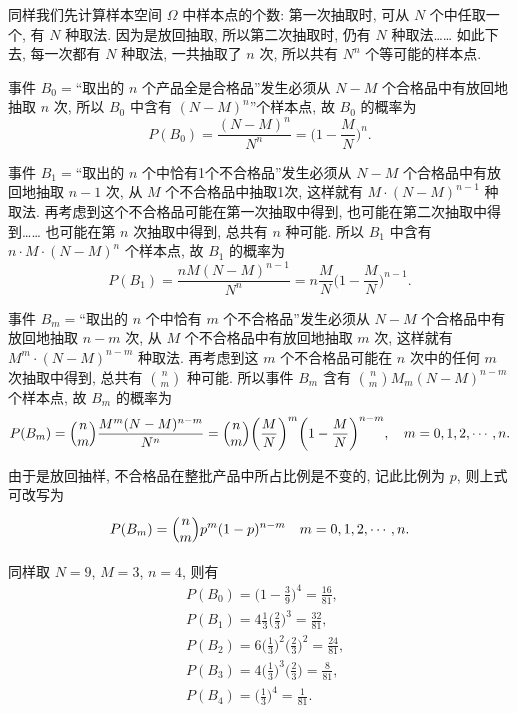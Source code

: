 \begin{solution}
  同样我们先计算样本空间 $\Omega$ 中样本点的个数:
  第一次抽取时,
  可从 $N$ 个中任取一个,
  有 $N$ 种取法.
  因为是放回抽取,
  所以第二次抽取时,
  仍有 $N$ 种取法……
  如此下去,
  每一次都有 $N$ 种取法,
  一共抽取了 $n$ 次,
  所以共有 $N ^n$ 个等可能的样本点.

  事件 $B _0=$“取出的 $n$ 个产品全是合格品”发生必须从 $N - M$ 个合格品中有放回地抽取 $n$ 次,
  所以 $B _0$ 中含有 $(N - M) ^n$”个样本点,
  故 $B _0$ 的概率为
  \[
    P ( B _0 ) = \frac{(N - M)^n}{N ^n} = \biggl( 1 - \frac{M}{N} \biggr) ^n.
  \]

  事件 $B _1=$“取出的 $n$ 个中恰有1个不合格品”发生必须从 $N - M$ 个合格品中有放回地抽取 $n - 1$ 次,
  从 $M$ 个不合格品中抽取1次,
  这样就有 $M \cdot (N - M) ^{n - 1}$ 种取法.
  再考虑到这个不合格品可能在第一次抽取中得到,
  也可能在第二次抽取中得到……
  也可能在第 $n$ 次抽取中得到,
  总共有 $n$ 种可能.
  所以 $B _1$ 中含有 $n \cdot M \cdot (N - M) ^n$ 个样本点,
  故 $B _1$ 的概率为
  \[
    P (B _1) = \frac{nM (N - M) ^{n - 1}}{N ^n} = n \frac{M}{N} \biggl( 1 - \frac{M}{N} \biggr) ^{n - 1}.
  \]

  事件 $B _m =$“取出的 $n$ 个中恰有 $m$ 个不合格品”发生必须从 $N - M$ 个合格品中有放回地抽取 $n - m$ 次,
  从 $M$ 个不合格品中有放回地抽取 $m$ 次,
  这样就有 $M^m \cdot (N - M) ^{n - m}$ 种取法.
  再考虑到这 $m$ 个不合格品可能在 $n$ 次中的任何 $m$ 次抽取中得到,
  总共有 $\binom{n}{m}$ 种可能.
  所以事件 $B _m$ 含有 $\binom{n}{m} M _m (N - M) ^{n - m}$ 个样本点,
  故 $B _m$ 的概率为
  \begin{equation}
    P (B _m) = \Binom{n}{m} \frac{M ^m (N - M)^{n - m}}{N ^n}
    = \Binom{n}{m} \biggl( \frac{M}{N} \biggr) ^m \biggl( 1 - \frac{M}{N} \biggr) ^{n - m},
    \quad m = 0, 1, 2, \dotsc, n.\label{eq1.2.7}
  \end{equation}

  由于是放回抽样,
  不合格品在整批产品中所占比例是不变的,
  记此比例为 $p$,
  则上式可改写为
  \[
    P (B _m) = \Binom{n}{m} p ^m (1 - p) ^{n - m} \quad m = 0, 1, 2, \dotsc, n.
  \]

  同样取 $N=9$,
  $M=3$,
  $n=4$,
  则有
  \begin{align*}
    & P (B _0) = \biggl(1 - \frac{3}{9} \biggr)^4 = \frac{16}{81},\\
    & P (B _1) = 4 \frac{1}{3} \biggl( \frac{2}{3} \biggr)^3 = \frac{32}{81},\\
    & P (B _2) = 6 \biggl( \frac{1}{3} \biggr) ^2 \biggl( \frac{2}{3} \biggr) ^2 = \frac{24}{81},\\
    & P (B _3) = 4 \biggl( \frac{1}{3} \biggr) ^3 \biggl( \frac{2}{3} \biggr) = \frac{8}{81},\\
    & P (B _4) = \biggl( \frac{1}{3} \biggr) ^4 = \frac{1}{81}.
  \end{align*}


\end{solution}
